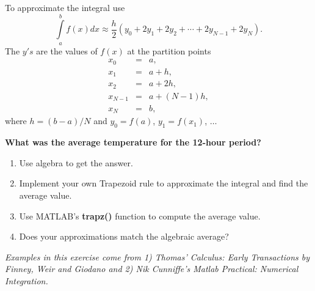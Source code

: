 \documentclass[10pt,fleqn]{article}
\begin{document}
To approximate the integral use $$\int \limits_a^b f(x) dx \approx \frac{h}{2}\left(y_0 + 2y_1 + 2y_2 + \cdots + 2y_{N-1} + 2y_N \right).$$ The $y's$ are the values of $f(x)$ at the partition points
\begin{eqnarray} \nonumber
x_0 &=& a, \\ \nonumber
x_1 &=& a+h, \\ \nonumber
x_2 &=& a+2h, \\ \nonumber
x_{N-1} &=& a+(N-1)h, \\ \nonumber
x_{N} &=& b,
\label{eqn:partition}
\end{eqnarray}
where $h=(b-a)/N$ and $y_0=f(a)$, $y_1=f(x_1)$, $\ldots$

\textbf{What was the average temperature for the 12-hour period?}
\begin{enumerate}
	\item Use algebra to get the answer.
	\item Implement your own Trapezoid rule to approximate the integral and find the average value.
	\item Use MATLAB's \textbf{trapz()} function to compute the average value.
	\item Does your approximations match the algebraic average?
\end{enumerate}

\vfill

\textit{Examples in this exercise come from 1) Thomas' Calculus: Early Transactions by Finney, Weir and Giodano and 2) Nik Cunniffe's Matlab Practical: Numerical Integration.}
\end{document}

